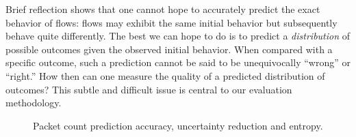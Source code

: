 \documentclass[conference]{IEEEtran}
\begin{document}
Brief reflection shows that one cannot hope to accurately predict the exact behavior of flows:
flows may exhibit the same initial behavior but subsequently behave quite differently.
The best we can hope to do is to predict a \emph{distribution} of possible outcomes given the observed initial behavior.
When compared with a specific outcome, such a prediction cannot be said to be unequivocally ``wrong'' or ``right.''
How then can one measure the quality of a predicted distribution of outcomes?
This subtle and difficult issue is central to our evaluation methodology.

\begin{figure}[t]
\begin{center}
\hfill
{}\hfill
{}\hfill
{}\hfill
\caption{Packet count prediction accuracy, uncertainty reduction and entropy.}
\end{center}
\vspace{-2em}
\end{figure}
\end{document}
